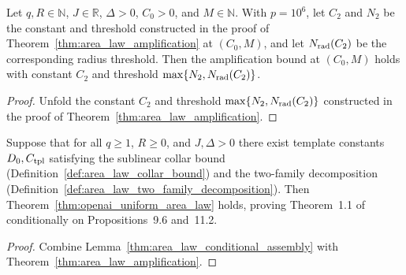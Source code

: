 \begin{lemma}
    \label{thm:area_law_amplification_explicit}
    \leanok
    Let $q,R\in\mathbb N$, $J\in\mathbb R$, $\Delta>0$, $C_0>0$, and
    $M\in\mathbb N$. With $p=10^6$, let $C_2$ and $N_2$ be the constant and
    threshold constructed in the proof of
    Theorem~\ref{thm:area_law_amplification} at $(C_0,M)$, and let $N_{\rm rad}(C_2)$
    be the corresponding radius threshold. Then the amplification bound at
    $(C_0,M)$ holds with constant $C_2$ and threshold
    $\max\{N_2,N_{\rm rad}(C_2)\}$.
\end{lemma}
\begin{proof}
    \leanok
    Unfold the constant $C_2$ and threshold $\max\{N_2,N_{\rm rad}(C_2)\}$
    constructed in the proof of Theorem~\ref{thm:area_law_amplification}.
\end{proof}

\begin{lemma}
    \label{thm:area_law_conditional_collar_two_families}
    \leanok
    Suppose that for all $q\ge1$, $R\ge0$, and $J,\Delta>0$ there exist template
    constants $D_0,C_{\rm tpl}$ satisfying the sublinear collar bound
    (Definition~\ref{def:area_law_collar_bound}) and the two-family
    decomposition (Definition~\ref{def:area_law_two_family_decomposition}). Then
    Theorem~\ref{thm:openai_uniform_area_law} holds, proving Theorem~1.1 of
    \cite{OpenAI2026AreaLaw} conditionally on Propositions~9.6 and~11.2.
\end{lemma}
\begin{proof}
    \leanok
    Combine Lemma~\ref{thm:area_law_conditional_assembly} with
    Theorem~\ref{thm:area_law_amplification}.
\end{proof}
